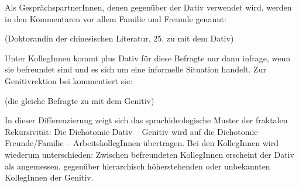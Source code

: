Als GesprächspartnerInnen, denen gegenüber der Dativ verwendet wird, werden in den Kommentaren vor allem Familie und Freunde genannt: 
\begin{exe}
\ex {} (Doktorandin der chinesischen Literatur, 25, zu \dank{} mit dem Dativ)
\end{exe}
Unter KollegInnen kommt \dank{} plus Dativ für diese Befragte nur dann infrage, wenn sie befreundet sind und es sich um eine informelle Situation handelt. 
Zur Genitivrektion bei \dank{} kommentiert sie: 
\begin{exe}
\ex {} (die gleiche Befragte zu \dank{} mit dem Genitiv)
\end{exe}
In dieser Differenzierung zeigt sich das sprachideologische Muster der fraktalen Rekursivität: 
Die Dichotomie Dativ -- Genitiv wird auf die Dichotomie Freunde/Familie -- ArbeitskollegInnen übertragen. 
Bei den KollegInnen wird wiederum unterschieden: 
Zwischen befreundeten KollegInnen erscheint der Dativ als angemessen, gegenüber hierarchisch höherstehenden oder unbekannten KollegInnen der Genitiv. 


